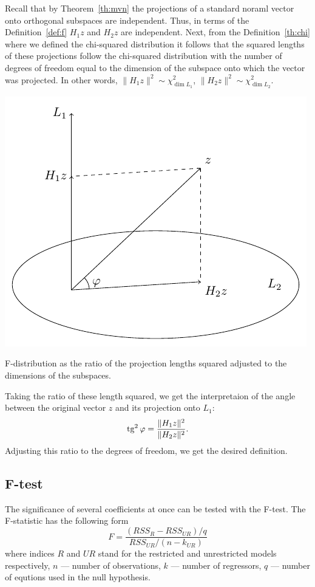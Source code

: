 Recall that by Theorem~\ref{th:mvn} the projections of a standard noraml vector
onto orthogonal subspaces are independent.
Thus, in terms of the Definition~\ref{def:f} $H_1 z$ and $H_2 z$ are independent.
Next, from the Definition~\ref{th:chi} where we defined the chi-squared distribution
it follows that the squared lengths of these projections follow
the chi-squared distribution with the number of degrees of freedom
equal to the dimension of the subspace onto which the vector was projected.
In other words, $\lVert H_1 z \rVert^2 \sim \chi^2_{\dim L_1}$,
$\lVert H_2 z \rVert^2 \sim \chi^2_{\dim L_2}$.

\begin{marginfigure}
\includegraphics[scale=0.7]{figures/04_f_dist_example.pdf}
\caption{F-distribution as the ratio of the projection lengths squared
adjusted to the dimensions of the subspaces.}
\label{fig:f_dist}
\end{marginfigure}

Taking the ratio of these length squared, we get the interpretaion
of the angle between the original vector $z$ and its projection onto $L_1$:
\[
\operatorname{tg}^2 \varphi = \frac{\lVert H_1 z \rVert^2}{\lVert H_2 z \rVert^2}.
\]
Adjusting this ratio to the degrees of freedom, we get the desired definition.


\subsection{F-test}

The significance of several coefficients at once can be tested with the F-test.
The F-statistic has the following form
\[
F = \frac{(RSS_{R} - RSS_{UR})/q}{RSS_{UR}/(n-k_{UR})}
\]
where indices $R$ and $UR$ stand for the restricted and unrestricted models
respectively, $n$ — number of observations, $k$ — number of regressors,
$q$ — number of equtions used in the null hypothesis.

